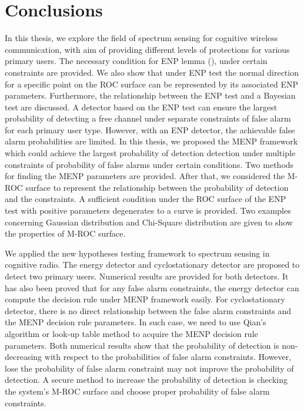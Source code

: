 \chapter{Conclusions}
In this thesis, we explore the field of spectrum sensing for cognitive wireless communication, with aim of providing different levels of protections for various primary users. The necessary condition for ENP lemma (), under certain constraints are provided. We also show that under ENP test the normal direction for a specific point on the ROC surface can be represented by its associated ENP parameters. Furthermore, the relationship between the ENP test and a Bayesian test are discussed. 
A detector based on the ENP test can ensure the largest probability of detecting a free channel under separate constraints of false alarm  for each primary user type. However, with an ENP detector, the achievable false alarm probabilities are limited.  
In this thesis, we proposed the MENP framework which could achieve the largest probability of detection detection under multiple constraints of probability of false alarms under certain conditions. Two methods for finding the MENP parameters are provided. 
After that, we considered the M-ROC surface to represent the relationship between the probability of detection and the constraints. A sufficient condition under the ROC surface of the ENP test with positive parameters degenerates to a curve is provided.  Two examples concerning Gaussian distribution and Chi-Square distribution are given to show the properties of M-ROC surface.

We applied the new hypotheses testing framework to spectrum sensing in cognitive radio. The energy detector and cyclostationary detector are proposed to detect two primary users. Numerical results are provided for both detectors. It has also been proved that for any false alarm constraints, the energy detector can compute the decision rule under MENP framework easily. For cyclostationary detector, there is no direct relationship between the false alarm constraints and the MENP decision rule parameters. In such case, we need to use Qian's algorithm or look-up table method to acquire the MENP decision rule parameters. Both numerical results show that the probability of detection is non-decreasing with respect to the probabilities of false alarm constraints. However, lose the probability of false alarm constraint may not improve the probability of detection. A secure method to increase the probability of detection is checking the system's M-ROC surface and choose  proper probability of false alarm constraints.  

